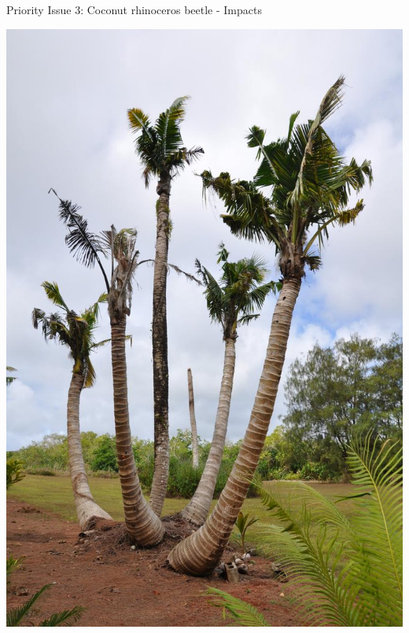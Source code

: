 \documentclass[]{beamer}
\begin{document}
\begin{frame}{Priority Issue 3: Coconut rhinoceros beetle - Impacts}
	\begin{center}
		\includegraphics[height=\textheight]{images/dying_coconuts}
	\end{center}
\end{frame}
\end{document}
